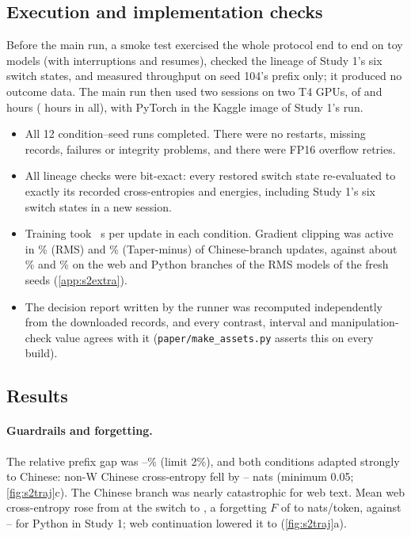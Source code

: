 \documentclass[11pt]{article}
\begin{document}
\subsection{Execution and implementation checks}
\label{sec:s2execution}

Before the main run, a smoke test exercised the whole protocol end to end on toy models (with interruptions and
resumes), checked the lineage of Study 1's six switch states, and measured throughput on seed 104's prefix only;
it produced no outcome data. The main run then used two sessions on two T4 GPUs, of \twoSessOne{} and \twoSessTwo{}
hours (\twoSessTotal{} hours in all), with PyTorch \twoTorch{} in the Kaggle image of Study 1's run.
\begin{itemize}[leftmargin=1.4em,itemsep=2pt]
  \item All 12 condition--seed runs completed. There were no restarts, missing records, failures or integrity
        problems, and there were \twoOverflow{} FP16 overflow retries.
  \item All \twoLineageN{} lineage checks were bit-exact: every restored switch state re-evaluated to exactly its
        recorded cross-entropies and energies, including Study 1's six switch states in a new session.
  \item Training took \twoSecRMS{}~s per update in each condition. Gradient clipping was active in \twoClipXR\%
        (RMS) and \twoClipXT\% (Taper-minus) of Chinese-branch updates, against about \twoClipWebR\% and
        \twoClipPyR\% on the web and Python branches of the RMS models of the fresh seeds (\cref{app:s2extra}).
  \item The decision report written by the runner was recomputed independently from the downloaded records, and
        every contrast, interval and manipulation-check value agrees with it (\texttt{paper/make\_assets.py}
        asserts this on every build).
\end{itemize}

\subsection{Results}
\label{sec:s2results}

\paragraph{Guardrails and forgetting.} The relative prefix gap was \twoGapMin--\twoGapMax\% (limit 2\%), and both
conditions adapted strongly to Chinese: non-W Chinese cross-entropy fell by \twoAdaptMin--\twoAdaptMax{} nats
(minimum 0.05; \cref{fig:s2traj}c). The Chinese branch was nearly catastrophic for web text. Mean web
cross-entropy rose from \twoPrefixCE{} at the switch to \twoXendCE{}, a forgetting $F$ of \twoFxMin{} to
\twoFxMax{} nats/token, against \FcodeMin--\FcodeMax{} for Python in Study 1; web continuation lowered it to
\twoWebEndCE{} (\cref{fig:s2traj}a).
\end{document}
